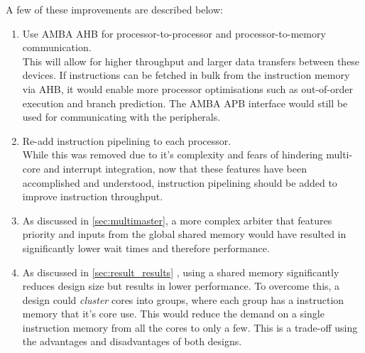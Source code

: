 A few of these improvements are described below:
\begin{enumerate}
\item Use AMBA AHB for processor-to-processor and processor-to-memory communication.\\
This will allow for higher throughput and larger data transfers between these devices. If instructions can be fetched in bulk from the instruction memory via AHB, it would enable more processor optimisations such as out-of-order execution and branch prediction. The AMBA APB interface would still be used for communicating with the peripherals.

\item Re-add instruction pipelining to each processor.\\While this was removed due to it's complexity and fears of hindering multi-core and interrupt integration, now that these features have been accomplished and understood, instruction pipelining should be added to improve instruction throughput.

\item As discussed in \cref{sec:multimaster}, a more complex arbiter that features priority and inputs from the global shared memory would have resulted in significantly lower wait times and therefore performance.

\item As discussed in \cref{sec:result_results} , using a shared memory significantly reduces design size but results in lower performance. To overcome this, a design could \textit{cluster} cores into groups, where each group has a instruction memory that it's core use. This would reduce the demand on a single instruction memory from all the cores to only a few. This is a trade-off using the advantages and disadvantages of both designs.
\end{enumerate}













